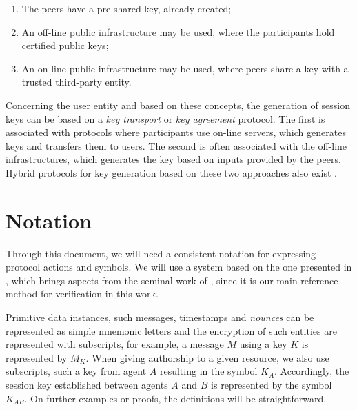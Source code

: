 \begin{enumerate}
  \item The peers have a pre-shared key, already created;
  \item An off-line public infrastructure may be used, where the participants hold certified public keys;
  \item An on-line public infrastructure may be used, where peers share a key with a trusted third-party entity.
\end{enumerate}

Concerning the user entity and based on these concepts, the generation of session keys can be based on a \textit{key transport} or \textit{key agreement} protocol. The first is associated with protocols where participants use on-line servers, which generates keys and transfers them to users. The second is often associated with the off-line infrastructures, which generates the key based on inputs provided by the peers. Hybrid protocols for key generation based on these two approaches also exist \cite{boyd-mathuria}.
























\section{Notation}
Through this document, we will need a consistent notation for expressing protocol actions and symbols. We will use a system based on the one presented in \cite{bella-book}, which brings aspects from the seminal work of \cite{ban}, since it is our main reference method for verification in this work.

Primitive data instances, such messages, timestamps and \textit{nounces} can be represented as simple mnemonic letters and the encryption of such entities are represented with subscripts, for example, a message $M$ using a key $K$ is represented by $M_K$. When giving authorship to a given resource, we also use subscripts, such a key from agent $A$ resulting in the symbol $K_A$. Accordingly, the session key established between agents $A$ and $B$ is represented by the symbol $K_{AB}$. On further examples or proofs, the definitions will be straightforward.

